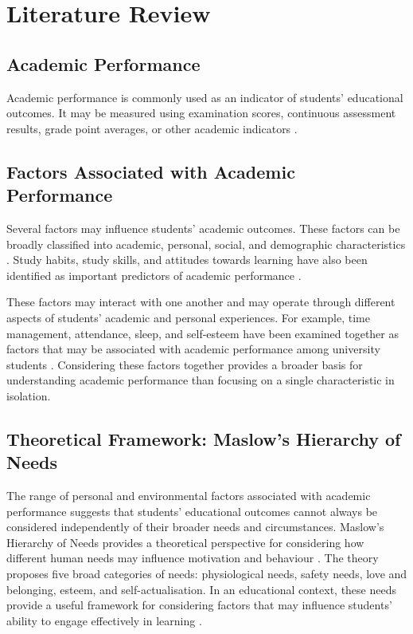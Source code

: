\section{Literature Review}

\subsection{Academic Performance}

Academic performance is commonly used as an indicator of students' educational outcomes. It may be measured using examination scores, continuous assessment results, grade point averages, or other academic indicators \citep{determinants2023academic}.

\subsection{Factors Associated with Academic Performance}

Several factors may influence students' academic outcomes. These factors can be broadly classified into academic, personal, social, and demographic characteristics \citep{determinants2023academic}. Study habits, study skills, and attitudes towards learning have also been identified as important predictors of academic performance \citep{crede2008study}.

These factors may interact with one another and may operate through different aspects of students' academic and personal experiences. For example, time management, attendance, sleep, and self-esteem have been examined together as factors that may be associated with academic performance among university students \citep{masnan2025academic}. Considering these factors together provides a broader basis for understanding academic performance than focusing on a single characteristic in isolation.

\subsection{Theoretical Framework: Maslow's Hierarchy of Needs}

The range of personal and environmental factors associated with academic performance suggests that students' educational outcomes cannot always be considered independently of their broader needs and circumstances. Maslow's Hierarchy of Needs provides a theoretical perspective for considering how different human needs may influence motivation and behaviour \citep{freitas2011maslow}. The theory proposes five broad categories of needs: physiological needs, safety needs, love and belonging, esteem, and self-actualisation. In an educational context, these needs provide a useful framework for considering factors that may influence students' ability to engage effectively in learning \citep{freitas2011maslow}.

